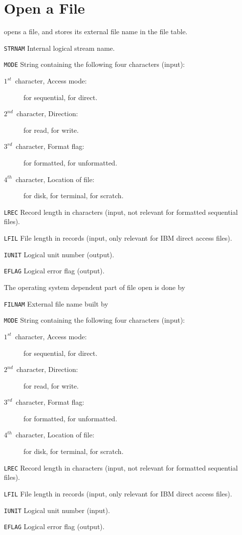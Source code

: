 \section{Open a File}
\label{FLOPEN}
opens a file, and stores its external file name in the file table.
\begin{mylist}
\item[\tt STRNAM]
Internal logical stream name.
\item[\tt MODE]
String containing the following four characters (input):
\begin{description}
\item[$1^{st}$~character, Access mode:]
 for sequential,  for direct.
\item[$2^{nd}$~character, Direction:]
 for read,  for write.
\item[$3^{rd}$~character, Format flag:]
 for formatted,  for unformatted.
\item[$4^{th}$~character, Location of file:]
 for disk,  for terminal,  for scratch.
\end{description}
\item[\tt LREC]
Record length in characters
(input, not relevant for formatted sequential files).
\item[\tt LFIL]
File length in records
(input, only relevant for IBM direct access files).
\item[\tt IUNIT]
Logical unit number (output). 
\item[\tt EFLAG]
Logical error flag (output).
\end{mylist}
The operating system dependent part of file open is done by
\begin{mylist}
\item[\tt FILNAM]
External file name built by 
\item[\tt MODE]
String containing the following four characters (input):
\begin{description}
\item[$1^{st}$~character, Access mode:]
 for sequential,  for direct.
\item[$2^{nd}$~character, Direction:]
 for read,  for write.
\item[$3^{rd}$~character, Format flag:]
 for formatted,  for unformatted.
\item[$4^{th}$~character, Location of file:]
 for disk,  for terminal,  for scratch.
\end{description}
\item[\tt LREC]
Record length in characters
(input, not relevant for formatted sequential files).
\item[\tt LFIL]
File length in records
(input, only relevant for IBM direct access files).
\item[\tt IUNIT]
Logical unit number (input). 
\item[\tt EFLAG]
Logical error flag (output). 
\end{mylist}

